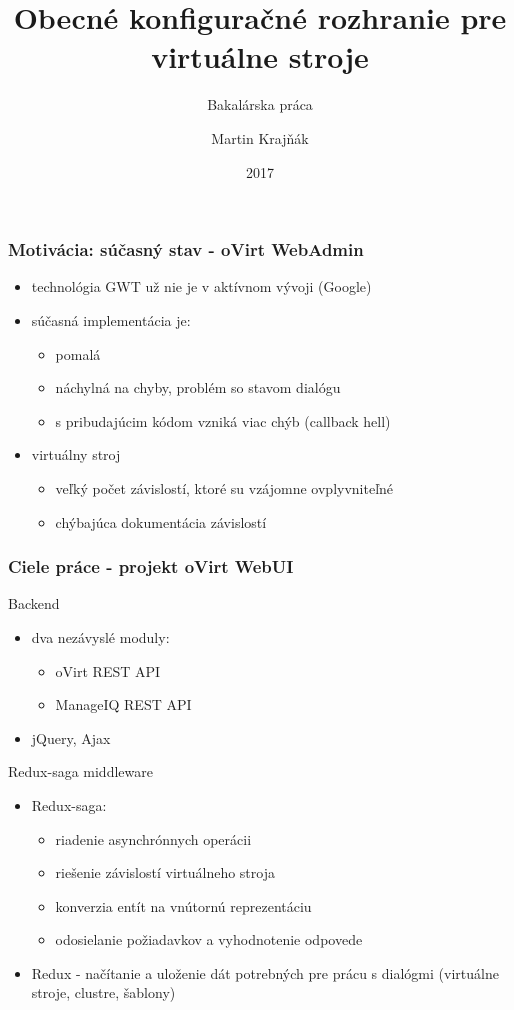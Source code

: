 \documentclass[pdf]{beamer}
\title{Obecné konfiguračné rozhranie pre virtuálne stroje}
\subtitle{Bakalárska práca}
\author{Martin Krajňák}
\date{2017}
\begin{document}
\begin{frame}
\titlepage
\end{frame}


\begin{frame}
\frametitle{Motivácia: súčasný stav - oVirt WebAdmin}
\begin{itemize}
\item technológia GWT už nie je v aktívnom vývoji (Google)
\item súčasná implementácia je:
\begin{itemize}
\item pomalá
\item náchylná na chyby, problém so stavom dialógu
\item s pribudajúcim kódom vzniká viac chýb (callback hell)
\end{itemize}
\item virtuálny stroj 
\begin{itemize}
\item veľký počet závislostí, ktoré su vzájomne ovplyvniteľné
\item chýbajúca dokumentácia závislostí
\end{itemize}
\end{itemize}
\end{frame}


\begin{frame}
\frametitle{Ciele práce - projekt oVirt WebUI}
\begin{block}{Backend}

\begin{itemize}
\item dva nezávyslé moduly:

\begin{itemize}
\item oVirt REST API
\item ManageIQ REST API
\end{itemize}

\item jQuery, Ajax
\end{itemize}

\end{block}

\begin{block}{Redux-saga middleware}
\begin{itemize}
\item Redux-saga:
\begin{itemize}
\item riadenie asynchrónnych operácii
\item riešenie závislostí virtuálneho stroja
\item konverzia entít na vnútornú reprezentáciu
\item odosielanie požiadavkov a vyhodnotenie odpovede
\end{itemize}
\item Redux - načítanie a uloženie dát potrebných pre prácu s dialógmi (virtuálne stroje, clustre, šablony)
\end{itemize}
\end{block}

\end{frame}
\end{document}
